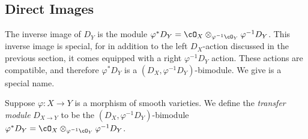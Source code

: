 
\subsection{Direct Images}\label{sec:direct-images}
The inverse image of $D_Y$ is the module $\varphi^*D_Y = \cO_X\otimes_{\varphi^{-1}\cO_Y}\varphi^{-1}D_Y$. This inverse image is special, for in addition to the left $D_X$-action discussed in the previous section, it comes equipped with a right $\varphi^{-1}D_Y$ action. These actions are compatible, and therefore $\varphi^*D_Y$ is a $(D_X,\varphi^{-1}D_Y)$-bimodule. We give is a special name. 
\begin{defn}\label{defn:transfer-module}
	Suppose $\varphi:X\to Y$ is a morphism of smooth varieties. We define the \emph{transfer module} $D_{X\to Y}$ to be the $(D_X,\varphi^{-1}D_Y)$-bimodule $\varphi^*D_Y = \cO_X\otimes_{\varphi^{-1}\cO_Y}\varphi^{-1}D_Y$.
\end{defn}

